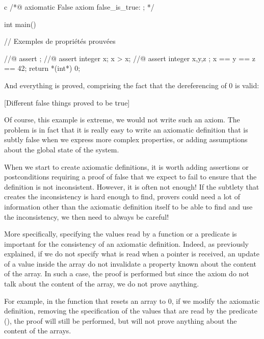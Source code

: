 \documentclass[middle]{zmdocument}
\begin{document}
\begin{CodeBlock}{c}
/*@
  axiomatic False{
    axiom false_is_true: \false;
  }
*/

int main(){
  // Exemples de propriétés prouvées

  //@ assert \false;
  //@ assert \forall integer x; x > x;
  //@ assert \forall integer x,y,z ; x == y == z == 42;
  return *(int*) 0;
}
\end{CodeBlock}



And everything is proved, comprising the fact that the dereferencing of
0 is valid:



[Different false things proved to be true]


Of course, this example is extreme, we would not write such an axiom.
The problem is in fact that it is really easy to write an axiomatic
definition that is subtly false when we express more complex properties,
or adding assumptions about the global state of the system.




When we start to create axiomatic definitions, it is worth adding
assertions or postconditions requiring a proof of false that we expect
to fail to ensure that the definition is not inconsistent. However, it
is often not enough! If the subtlety that creates the inconsistency is
hard enough to find, provers could need a lot of information other than
the axiomatic definition itself to be able to find and use the
inconsistency, we then need to always be careful!




More specifically, specifying the values read by a function or a
predicate is important for the consistency of an axiomatic definition.
Indeed, as previously explained, if we do not specify what is read when
a pointer is received, an update of a value inside the array do not
invalidate a property known about the content of the array. In such a
case, the proof is performed but since the axiom do not talk about the
content of the array, we do not prove anything.




For example, in the function that resets an array to 0, if we modify the
axiomatic definition, removing the specification of the values that are
read by the predicate (), the proof
will still be performed, but will not prove anything about the content
of the arrays.
\end{document}
